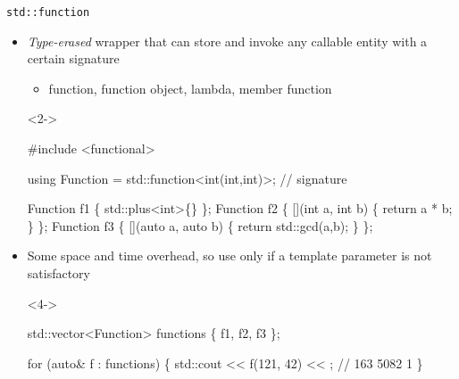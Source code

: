 \begin{frame}[fragile]{\texttt{std::function}}

  \begin{itemize}
  \item \textit{Type-erased} wrapper that can store and invoke any callable
    entity with a certain signature
    \begin{itemize}
    \item function, function object, lambda, member function
    \end{itemize}

    \begin{codeblock}<2->{
#include <functional>

using Function = std::function<\alert{int(int,int)}>; // \alert{signature}

Function f1 \{ std::plus<int>\{\} \};
Function f2 \{ [](int a, int b) \{ return a * b; \} \};
Function f3 \{ [](auto a, auto b) \{ return std::gcd(a,b); \} \};}\end{codeblock}

  \item<3-> Some space and time overhead, so use only if a template parameter is
    not satisfactory
    \begin{codeblock}<4->{
std::vector<Function> functions \{ f1, f2, f3 \};

for (auto& f : functions) \{
  std::cout << f(121, 42) << \bslashn; // 163 5082 1
\}}\end{codeblock}

  \end{itemize}

\end{frame}
